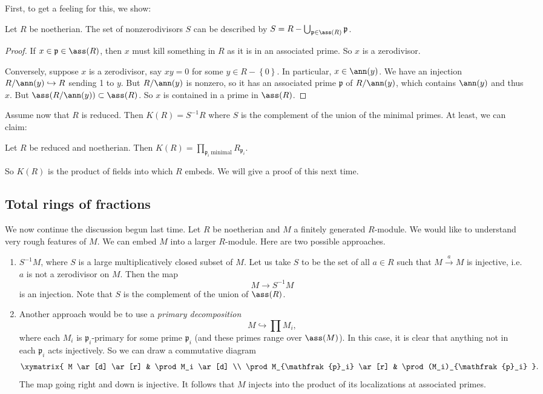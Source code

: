 First, to get a feeling for this, we show:

\begin{proposition} Let $R$ be noetherian. The set of nonzerodivisors $S$ can be described by
$S = R- \bigcup_{\mathfrak{p} \in \ass(R)} \mathfrak{p}$.
\end{proposition} 
\begin{proof} 
If $x \in\mathfrak{p} \in \ass(R)$, then $x$ must kill something in $R$ as it
is in an associated prime. 	So $x$ is a zerodivisor. 

Conversely, suppose $x$ is a zerodivisor, say $xy = 0$ for some $y \in R -
\left\{0\right\}$. In
particular, $x \in \ann(y)$. We have an injection $R/\ann(y) \hookrightarrow R$
sending 1 to $y$. But $R/\ann(y)$ is nonzero, so it has an associated prime
$\mathfrak{p}$ of $R/\ann(y)$, which contains $\ann(y)$ and thus $x$. But $\ass(R/\ann(y)) \subset \ass(R)$. 
So $x$ is contained in a prime in $\ass(R)$. 
\end{proof} 

Assume now that $R$ is reduced.  Then $K(R)  = S^{-1}R$ where $S$ is the
complement of the union of the minimal primes. 
At least, we can claim:

\begin{proposition} Let $R$ be reduced and noetherian. Then
$K(R) = \prod_{\mathfrak{p}_i \ \mathrm{minimal}} R_{\mathfrak{p}_i}$.
\end{proposition} 

So $K(R)$ is the product of fields into which $R$ embeds.  
We will give a proof of this next time. 
\subsection{Total rings of fractions}

We now continue the discussion begun last time. Let $R$ be noetherian and $M$ a
finitely generated $R$-module. We would like to understand very rough features of $M$.  
We can embed $M$ into a larger $R$-module.
Here are two possible approaches.

\begin{enumerate}
\item  $S^{-1}M$, where $S$ is a large multiplicatively closed subset of $M$.
Let us take $S $ to be the set of all $a \in R$ such that $M
\stackrel{a}{\to}M$ is injective, i.e. $a$ is not a zerodivisor on $M$. Then
the map 
\[ M \to S^{-1}M  \]
is an injection. Note that $S$ is the complement of the union of $\ass(R)$.
\item Another approach would be to use a \emph{primary decomposition}
\[ M \hookrightarrow \prod M_i,  \]
where each $M_i$ is $\mathfrak{p}_i$-primary for some prime $\mathfrak{p}_i$
(and these primes range over $\ass(M)$). In this case, it is clear that
anything not in each $\mathfrak{p}_i$ acts injectively. So we can draw a
commutative diagram
\[ 
\xymatrix{
M \ar[d]  \ar[r] &  \prod M_i \ar[d]  \\
\prod M_{\mathfrak{p}_i} \ar[r] &  \prod (M_i)_{\mathfrak{p}_i}
}.
\]
The map going right and down is injective.
It follows that $M$ injects into the product of its localizations at associated
primes. 
\end{enumerate}


